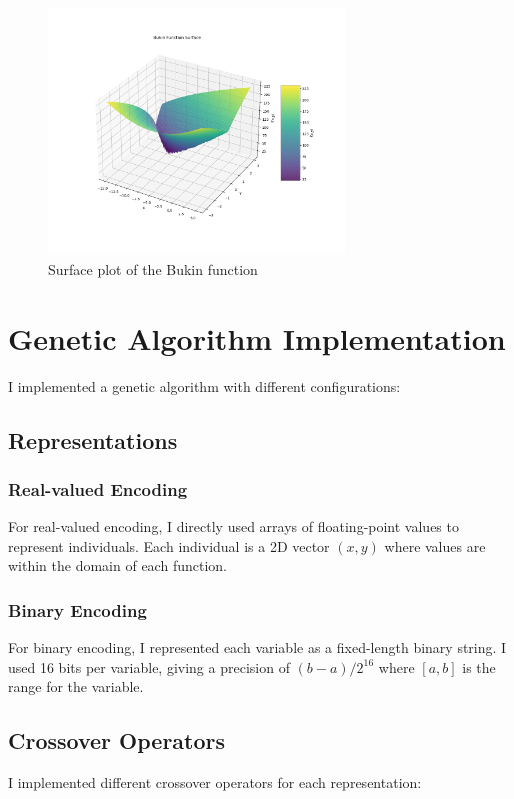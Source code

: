 \documentclass{article}
\begin{document}
\begin{figure}[H]
\centering
\includegraphics[width=0.7\textwidth]{Bukin_Function_Surface_surface.png}
\caption{Surface plot of the Bukin function}
\label{fig:bukin_surface}
\end{figure}

\section{Genetic Algorithm Implementation}
I implemented a genetic algorithm with different configurations:

\subsection{Representations}
\subsubsection{Real-valued Encoding}
For real-valued encoding, I directly used arrays of floating-point values to represent individuals. Each individual is a 2D vector $(x, y)$ where values are within the domain of each function.

\subsubsection{Binary Encoding}
For binary encoding, I represented each variable as a fixed-length binary string. I used 16 bits per variable, giving a precision of $(b-a)/2^{16}$ where $[a,b]$ is the range for the variable.

\subsection{Crossover Operators}
I implemented different crossover operators for each representation:
\end{document}

